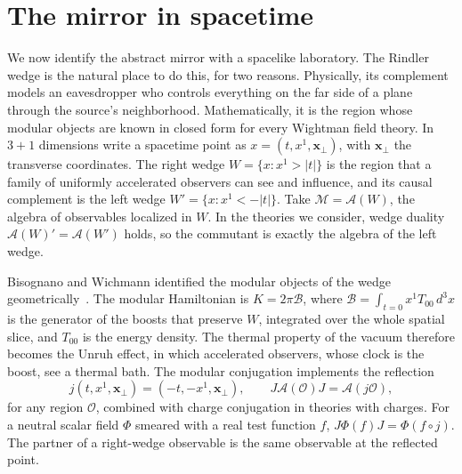 \documentclass[11pt,a4paper]{article}
\newcommand{\M}{\mathcal M}
\newcommand{\A}{\mathcal A}
\newcommand{\Oreg}{\mathcal O}
\begin{document}
\section{The mirror in spacetime}
\label{sec:geometry}

We now identify the abstract mirror with a spacelike laboratory. The Rindler wedge is the natural place to do this, for two reasons. Physically, its complement models an eavesdropper who controls everything on the far side of a plane through the source's neighborhood. Mathematically, it is the region whose modular objects are known in closed form for every Wightman field theory. In $3+1$ dimensions write a spacetime point as $x=(t,x^1,\bm x_\perp)$, with $\bm x_\perp$ the transverse coordinates. The right wedge $W=\{x:x^1>|t|\}$ is the region that a family of uniformly accelerated observers can see and influence, and its causal complement is the left wedge $W'=\{x:x^1<-|t|\}$. Take $\M=\A(W)$, the algebra of observables localized in $W$. In the theories we consider, wedge duality $\A(W)'=\A(W')$ holds, so the commutant is exactly the algebra of the left wedge.

Bisognano and Wichmann identified the modular objects of the wedge geometrically~\cite{bisognano1975duality,bisognano1976duality}. The modular Hamiltonian is $K=2\pi\mathcal B$, where $\mathcal B=\int_{t=0}x^1T_{00}\,d^3x$ is the generator of the boosts that preserve $W$, integrated over the whole spatial slice, and $T_{00}$ is the energy density. The thermal property of the vacuum therefore becomes the Unruh effect, in which accelerated observers, whose clock is the boost, see a thermal bath. The modular conjugation implements the reflection
\begin{equation}
 j(t,x^1,\bm x_\perp)=(-t,-x^1,\bm x_\perp),\qquad J\A(\Oreg)J=\A(j\Oreg),
 \label{eq:reflection}
\end{equation}
for any region $\Oreg$, combined with charge conjugation in theories with charges. For a neutral scalar field $\Phi$ smeared with a real test function $f$, $J\Phi(f)J=\Phi(f\circ j)$. The partner of a right-wedge observable is the same observable at the reflected point.
\end{document}
